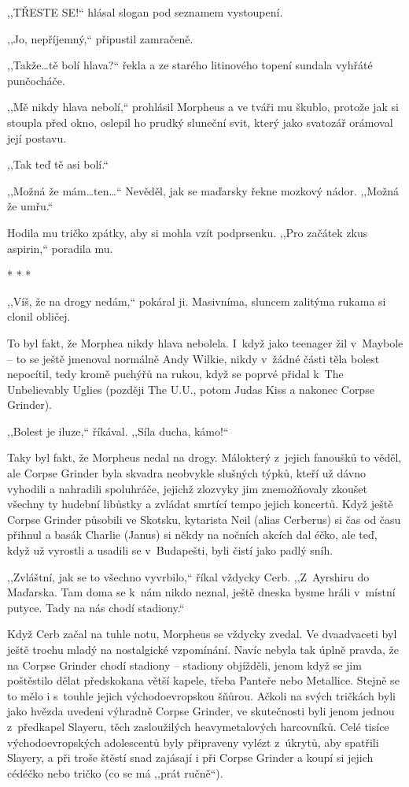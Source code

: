 ,,TŘESTE SE!`` hlásal slogan pod seznamem vystoupení.

,,Jo, nepříjemný,`` připustil zamračeně.

,,Takže\ldots tě bolí hlava?`` řekla a ze starého litinového topení sundala vyhřáté punčocháče.

,,Mě nikdy hlava nebolí,`` prohlásil Morpheus a ve tváři mu škublo, protože jak si stoupla před okno, oslepil ho prudký sluneční svit, který jako svatozář orámoval její postavu.

,,Tak teď tě asi bolí.``

,,Možná že mám\ldots ten\ldots`` Nevěděl, jak se maďarsky řekne mozkový nádor. ,,Možná že umřu.``

Hodila mu tričko zpátky, aby si mohla vzít podprsenku. ,,Pro začátek zkus aspirin,`` poradila mu.

\begin{center}
* * *
\end{center}

,,Víš, že na drogy nedám,`` pokáral ji. Masivníma, sluncem zalitýma rukama si clonil obličej.

To byl fakt, že Morphea nikdy hlava nebolela. I~když jako teenager žil v Maybole – to se ještě jmenoval normálně Andy Wilkie, nikdy v žádné části těla bolest nepocítil, tedy kromě puchýřů na rukou, když se poprvé přidal k The Unbelievably Uglies (později The U.U., potom Judas Kiss a nakonec Corpse Grinder). 

,,Bolest je iluze,`` říkával. ,,Síla ducha, kámo!``

Taky byl fakt, že Morpheus nedal na drogy. Málokterý z jejich fanoušků to věděl, ale Corpse Grinder byla skvadra neobvykle slušných týpků, kteří už dávno vyhodili a nahradili spoluhráče, jejichž zlozvyky jim znemožňovaly zkoušet všechny ty hudební libůstky a zvládat smrtící tempo jejich koncertů. Když ještě Corpse Grinder působili ve Skotsku, kytarista Neil (alias Cerberus) si čas od času přihnul a basák Charlie (Janus) si někdy na nočních akcích dal éčko, ale teď, když už vyrostli a usadili se v Budapešti, byli čistí jako padlý sníh.

,,Zvláštní, jak se to všechno vyvrbilo,`` říkal vždycky Cerb. ,,Z~Ayrshiru do Maďarska. Tam doma se k nám nikdo neznal, ještě dneska bysme hráli v místní putyce. Tady na nás chodí stadiony.``

Když Cerb začal na tuhle notu, Morpheus se vždycky zvedal. Ve dvaadvaceti byl ještě trochu mladý na nostalgické vzpomínání. Navíc nebyla tak úplně pravda, že na Corpse Grinder chodí stadiony – stadiony objížděli, jenom když se jim poštěstilo dělat předskokana větší kapele, třeba Panteře nebo Metallice. Stejně se to mělo i s touhle jejich východoevropskou šňůrou. Ačkoli na svých tričkách byli jako hvězda uvedeni výhradně Corpse Grinder, ve skutečnosti byli jenom jednou z předkapel Slayeru, těch zasloužilých heavymetalových harcovníků. Celé tisíce východoevropských adolescentů byly připraveny vylézt z úkrytů, aby spatřili Slayery, a při troše štěstí snad zajásají i při Corpse Grinder a koupí si jejich cédéčko nebo tričko (co se má ,,prát ručně``).

